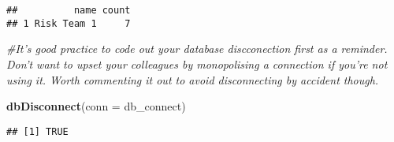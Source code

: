 \documentclass[]{article}
\newenvironment{Shaded}{\begin{snugshade}}{\end{snugshade}}
\newcommand{\CommentTok}[1]{\textcolor[rgb]{0.56,0.35,0.01}{\textit{#1}}}
\newcommand{\DataTypeTok}[1]{\textcolor[rgb]{0.13,0.29,0.53}{#1}}
\newcommand{\KeywordTok}[1]{\textcolor[rgb]{0.13,0.29,0.53}{\textbf{#1}}}
\newcommand{\NormalTok}[1]{#1}
\begin{document}
\begin{verbatim}
##          name count
## 1 Risk Team 1     7
\end{verbatim}

\begin{Shaded}
\begin{Highlighting}[]
\CommentTok{#It's good practice to code out your database discconection first as a reminder.  Don't want to upset your colleagues by monopolising a connection if you're not using it.  Worth commenting it out to avoid disconnecting by accident though.}

\KeywordTok{dbDisconnect}\NormalTok{(}\DataTypeTok{conn =}\NormalTok{ db_connect)}
\end{Highlighting}
\end{Shaded}

\begin{verbatim}
## [1] TRUE
\end{verbatim}
\end{document}
